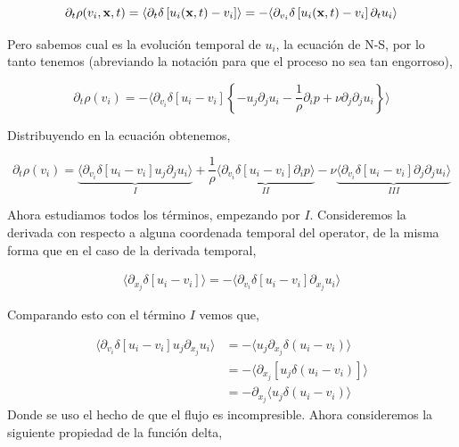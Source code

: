 \documentclass[executivepaper,12pt]{article}
\numberwithin{equation}{section}
\begin{document}
\begin{equation*}
	\partial_t \rho(v_i,\vb{x},t)=\langle \partial_t \delta\left[u_i(\vb{x},t)-v_i\right] \rangle = -\langle \partial_{v_i} \delta\left[u_i(\vb{x},t)-v_i\right] \partial_t u_i \rangle
\end{equation*}

Pero sabemos cual es la evolución temporal de $u_i$, la ecuación de N-S, por lo tanto tenemos (abreviando la notación para que el proceso no sea tan engorroso),

\begin{equation*}
	\partial_t \rho(v_i)=-\langle \partial_{v_i} \delta\left[u_i-v_i\right] \left\{ -u_j \partial_j u_i -\frac{1}{\rho}\partial_i p +\nu \partial_j\partial_j u_i\right\} \rangle
\end{equation*}

 Distribuyendo en la ecuación obtenemos,
 
 \begin{equation*}
 	\partial_t \rho(v_i)=\underbrace{\langle \partial_{v_i} \delta\left[u_i-v_i\right]u_j \partial_j u_i\rangle}_{I} +\frac{1}{\rho} \underbrace{\langle \partial_{v_i} \delta\left[u_i-v_i\right]\partial_i p \rangle}_{II} -\nu \underbrace{\langle \partial_{v_i} \delta\left[u_i-v_i\right]\partial_j\partial_j u_i \rangle}_{III}
 \end{equation*}

Ahora estudiamos todos los términos, empezando por $I$. Consideremos la derivada con respecto a alguna coordenada temporal del operator, de la misma forma que en el caso de la derivada temporal, 

\begin{align*}
	\langle \partial_{x_j} \delta\left[u_i-v_i\right] \rangle = -\langle \partial_{v_i} \delta\left[u_i-v_i\right] \partial_{x_j} u_i \rangle
\end{align*}

Comparando esto con el término $I$ vemos que,

\begin{align*}
	\langle \partial_{v_i} \delta\left[u_i-v_i\right]u_j \partial_{x_j} u_i\rangle&=-\langle u_j\partial_{x_j}\delta(u_i-v_i) \rangle\\
	&=-\langle \partial_{x_j} \left[u_j\delta(u_i-v_i)\right] \rangle\\
	&=-\partial_{x_j} \langle u_j\delta(u_i-v_i) \rangle
\end{align*}
Donde se uso el hecho de que el flujo es incompresible. Ahora consideremos la siguiente propiedad de la función delta,
\end{document}
